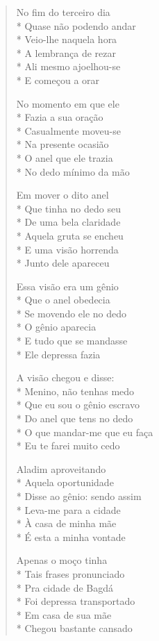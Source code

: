 \begin{verse}
No fim do terceiro dia\\*
Quase não podendo andar\\*
Veio-lhe naquela hora\\*
A lembrança de rezar\\*
Ali mesmo ajoelhou-se\\*
E começou a orar

No momento em que ele\\*
Fazia a sua oração\\*
Casualmente moveu-se\\*
Na presente ocasião\\*
O anel que ele trazia\\*
No dedo mínimo da mão

Em mover o dito anel\\*
Que tinha no dedo seu\\*
De uma bela claridade\\*
Aquela gruta se encheu\\*
E uma visão horrenda\\*
Junto dele apareceu

Essa visão era um gênio\\*
Que o anel obedecia\\*
Se movendo ele no dedo\\*
O gênio aparecia\\*
E tudo que se mandasse\\*
Ele depressa fazia

A visão chegou e disse:\\*
Menino, não tenhas medo\\*
Que eu sou o gênio escravo\\*
Do anel que tens no dedo\\*
O que mandar-me que eu faça\\*
Eu te farei muito cedo

Aladim aproveitando\\*
Aquela oportunidade\\*
Disse ao gênio: sendo assim\\*
Leva-me para a cidade\\*
À casa de minha mãe\\*
É esta a minha vontade

Apenas o moço tinha\\*
Tais frases pronunciado\\*
Pra cidade de Bagdá\\*
Foi depressa transportado\\*
Em casa de sua mãe\\*
Chegou bastante cansado


\end{verse}
